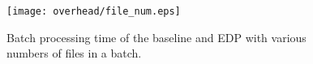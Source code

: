 \begin{figure}[H]
\centering
\hspace{20pt}
\texttt{[image: overhead/file\_num.eps]}
\caption{Batch processing time of the baseline and EDP with various numbers of
files in a batch.}
\label{fig:file_num}
\end{figure}





